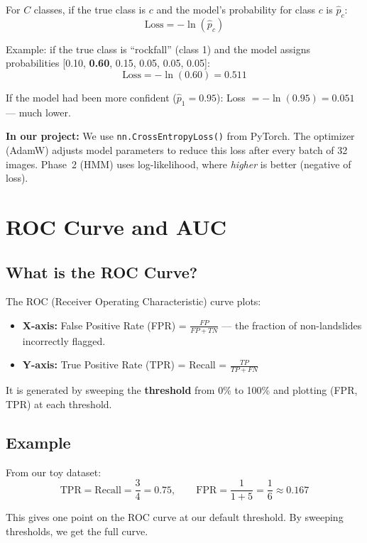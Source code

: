 \documentclass[11pt]{article}
\begin{document}
For $C$ classes, if the true class is $c$ and the model's probability for class $c$ is $\hat{p}_c$:
\[
\text{Loss} = -\ln(\hat{p}_c)
\]

\noindent Example: if the true class is ``rockfall'' (class 1) and the model assigns probabilities [0.10, \textbf{0.60}, 0.15, 0.05, 0.05, 0.05]:
\[
\text{Loss} = -\ln(0.60) = 0.511
\]

\noindent If the model had been more confident ($\hat{p}_1 = 0.95$): Loss $= -\ln(0.95) = 0.051$ --- much lower.

\medskip
\noindent\textbf{In our project:} We use \texttt{nn.CrossEntropyLoss()} from PyTorch.
The optimizer (AdamW) adjusts model parameters to reduce this loss after every batch of 32 images.
Phase~2 (HMM) uses log-likelihood, where \emph{higher} is better (negative of loss).

\section{ROC Curve and AUC}

\subsection{What is the ROC Curve?}

The ROC (Receiver Operating Characteristic) curve plots:
\begin{itemize}[noitemsep]
    \item \textbf{X-axis:} False Positive Rate (FPR) = $\frac{FP}{FP + TN}$ --- the fraction of non-landslides incorrectly flagged.
    \item \textbf{Y-axis:} True Positive Rate (TPR) = Recall = $\frac{TP}{TP + FN}$
\end{itemize}

\noindent It is generated by sweeping the \textbf{threshold} from 0\% to 100\% and plotting (FPR, TPR) at each threshold.

\subsection{Example}

From our toy dataset:
\[
\text{TPR} = \text{Recall} = \frac{3}{4} = 0.75, \qquad
\text{FPR} = \frac{1}{1+5} = \frac{1}{6} \approx 0.167
\]

\noindent This gives one point on the ROC curve at our default threshold.
By sweeping thresholds, we get the full curve.
\end{document}
